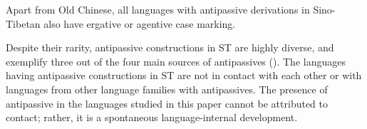 \documentclass[oneside,a4paper,11pt]{article}
\begin{document}
Apart from Old Chinese, all languages with antipassive derivations in Sino-Tibetan also have ergative or agentive case marking.

Despite their rarity, antipassive constructions in ST are highly diverse, and exemplify three out of the four main sources of antipassives (\citealt{sanso17antipassive}). The languages having antipassive constructions in ST are not in contact with each other or with languages from other language families with antipassives. The presence of antipassive in the languages studied in this paper cannot be attributed to contact; rather, it is a spontaneous language-internal development.

 




 
\end{document}
